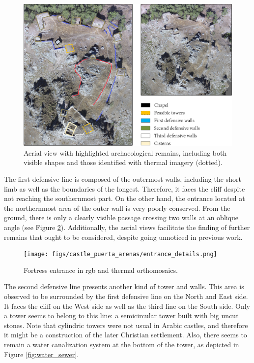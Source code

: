 \begin{figure}[htbp]
    \centering
    \includegraphics[width=\linewidth]{figs/castle_puerta_arenas/castle_annotations.png}
    \caption{Aerial view with highlighted archaeological remains, including both visible shapes and those identified with thermal imagery (dotted). }
    \label{fig:archaeological_remains_structure}
\end{figure}

The first defensive line is composed of the outermost walls, including the short limb as well as the boundaries of the longest. Therefore, it faces the cliff despite not reaching the southernmost part. On the other hand, the entrance located at the northernmost area of the outer wall is very poorly conserved. From the ground, there is only a clearly visible passage crossing two walls at an oblique angle (see Figure \ref{fig:entrance_details}). Additionally, the aerial views facilitate the finding of further remains that ought to be considered, despite going unnoticed in previous work. 

\begin{figure}[htbp]
    \centering
    \texttt{[image: figs/castle\_puerta\_arenas/entrance\_details.png]}
    \caption{Fortress entrance in \acrshort{rgb} and thermal orthomosaics.}
    \label{fig:entrance_details}
\end{figure}

The second defensive line presents another kind of tower and walls. This area is observed to be surrounded by the first defensive line on the North and East side. It faces the cliff on the West side as well as the third line on the South side. Only a tower seems to belong to this line: a semicircular tower built with big uncut stones. Note that cylindric towers were not usual in Arabic castles, and therefore it might be a construction of the later Christian settlement. Also, there seems to remain a water canalization system at the bottom of the tower, as depicted in Figure \ref{fig:water_sewer}.

